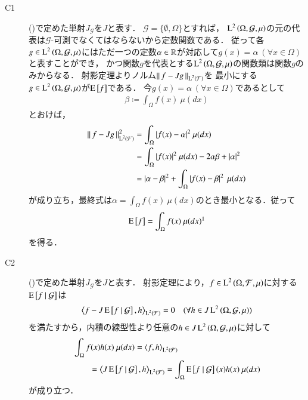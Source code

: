 	
	\begin{prf}\mbox{}
		\begin{description}
			\item[C1] 
				()で定めた単射$J_{\mathcal{G}}$を$J$と表す．
				$\mathcal{G} = \{\emptyset, \Omega\}$とすれば，
				$\operatorname{L}^{2} \left(\Omega, \mathcal{G},\mu\right)$の元の代表は$\mathcal{G}$-可測でなくてはならないから定数関数である．
				従って各$g \in \operatorname{L}^{2} \left(\Omega, \mathcal{G},\mu\right)$にはただ一つの定数$\alpha \in \mathbb{R}$が対応して$g(x)=\alpha\ (\forall x \in \Omega)$と表すことができ，
				かつ関数$g$を代表とする$\operatorname{L}^{2} \left(\Omega, \mathcal{G},\mu\right)$の関数類は関数$g$のみからなる．
				射影定理よりノルム$\left\|\, f-J g\, \right\|_{\operatorname{L}^{2} \left(\mathcal{F}\right)}$を
				最小にする$g \in \operatorname{L}^{2} \left(\Omega, \mathcal{G},\mu\right)$が$\operatorname{E} \left[ f \right]$である．
				今$g(x)=\alpha\ (\forall x \in \Omega)$であるとして
				\begin{align}
					\beta \coloneqq \int_{\Omega} f(x)\ \mu(dx)
				\end{align}
				とおけば，
				\begin{align}
					\left\|\, f-J g\, \right\|_{\operatorname{L}^{2} \left(\mathcal{F}\right)}^2 
					&= \int_{\Omega} |f(x) - \alpha|^2\ \mu(dx) \\
					&= \int_{\Omega} |f(x)|^2\ \mu(dx) - 2 \alpha \beta + |\alpha|^2 \\
					&= \left| \alpha - \beta \right|^2 + \int_{\Omega} \left| f(x) - \beta \right|^2\ \mu(dx)
				\end{align}
				が成り立ち，最終式は$\alpha = \int_{\Omega} f(x)\ \mu(dx)$のとき最小となる．従って
				\begin{align}
					\Exp{f} = \int_{\Omega} f(x)\ \mu(dx)\footnotemark
				\end{align}
				を得る．
				
			\item[C2] 
				()で定めた単射$J_{\mathcal{G}}$を$J$と表す．
				射影定理により，$f \in \operatorname{L}^{2} \left(\Omega, \mathcal{F},\mu\right)$に対する$\operatorname{E} \left[ f \ \middle|\ \mathcal{G} \right]$は
				\begin{align}
					\inprod<f - J \cexp{f}{\mathcal{G}}, h>_{\Lp{2}{\mathcal{F}}} = 0 \quad (\forall h \in J \Lp{2}{\Omega, \mathcal{G},\mu})
				\end{align}
				を満たすから，内積の線型性より任意の$h \in J \operatorname{L}^{2} \left(\Omega, \mathcal{G},\mu\right)$に対して
				\begin{align}
					&\int_{\Omega} f(x)h(x)\ \mu(dx) = \inprod<f, h>_{\Lp{2}{\mathcal{F}}} \\
					&\qquad = \inprod<J \cexp{f}{\mathcal{G}}, h>_{\Lp{2}{\mathcal{F}}} = \int_{\Omega} \cexp{f}{\mathcal{G}}(x)h(x)\ \mu(dx)
				\end{align}
				が成り立つ．
				

\end{description}
\end{prf}
